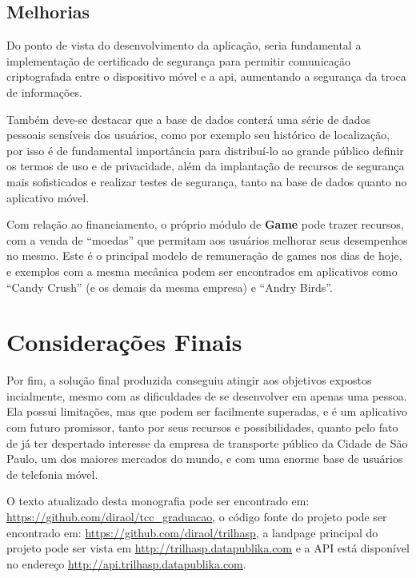 \subsection{Melhorias}
Do ponto de vista do desenvolvimento da aplicação, seria fundamental a implementação de certificado de segurança para permitir comunicação criptografada entre o dispositivo móvel e a \gls{api}, aumentando a segurança da troca de informações.

Também deve-se destacar que a base de dados conterá uma série de dados pessoais sensíveis dos usuários, como por exemplo seu histórico de localização, por isso é de fundamental importância para distribuí-lo ao grande público definir os termos de uso e de privacidade, além da implantação de recursos de segurança mais sofisticados e realizar testes de segurança, tanto na base de dados quanto no aplicativo móvel.

Com relação ao financiamento, o próprio módulo de \textbf{Game} pode trazer recursos, com a venda de ``moedas'' que permitam aos usuários melhorar seus desempenhos no mesmo. Este é o principal modelo de remuneração de games nos dias de hoje, e exemplos com a mesma mecânica podem ser encontrados em aplicativos como ``Candy Crush'' (e os demais da mesma empresa) e ``Andry Birds''.

\section{Considerações Finais}
Por fim, a solução final produzida conseguiu atingir aos objetivos expostos incialmente, mesmo com as dificuldades de se desenvolver em apenas uma pessoa. Ela possui limitações, mas que podem ser facilmente superadas, e é um aplicativo com futuro promissor, tanto por seus recursos e possibilidades, quanto pelo fato de já ter despertado interesse da empresa de transporte público da Cidade de São Paulo, um dos maiores mercados do mundo, e com uma enorme base de usuários de telefonia móvel.

O texto atualizado desta monografia pode ser encontrado em: \\
\url{https://github.com/diraol/tcc_graduacao}, o código fonte do projeto pode ser encontrado em: \url{https://github.com/diraol/trilhasp}, a landpage principal do projeto pode ser vista em \url{http://trilhasp.datapublika.com} e a API está disponível no endereço \url{http://api.trilhasp.datapublika.com}.